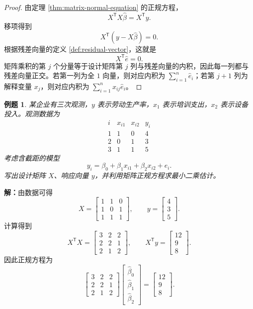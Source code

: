 \documentclass[UTF8,fontset=fandol,11pt]{ctexart}
\newtheorem{example}[definition]{例题}
\begin{document}
\begin{proof}
由定理 \eqref{thm:matrix-normal-equation} 的正规方程，
\[
X^{\mathsf T}X\hat\beta=X^{\mathsf T}y.
\]
移项得到
\[
X^{\mathsf T}(y-X\hat\beta)=0.
\]
根据残差向量的定义 \eqref{def:residual-vector}，这就是
\[
X^{\mathsf T}\hat e=0.
\]
矩阵乘积的第 $j$ 个分量等于设计矩阵第 $j$ 列与残差向量的内积，因此每一列都与残差向量正交。若第一列为全 $1$ 向量，则对应内积为 $\sum_{i=1}^{n}\hat e_i$；若第 $j+1$ 列为解释变量 $x_j$，则对应内积为 $\sum_{i=1}^{n}x_{ij}\hat e_i$。
\end{proof}
\begin{example}
某企业有三次观测，$y$ 表示劳动生产率，$x_1$ 表示培训支出，$x_2$ 表示设备投入。观测数据为
\[
\begin{array}{c|c|c|c}
 i&x_{i1}&x_{i2}&y_i\\ \hline
 1&1&0&4\\
 2&0&1&3\\
 3&1&1&5
\end{array}
\]
考虑含截距的模型
\[
y_i=\beta_0+\beta_1x_{i1}+\beta_2x_{i2}+e_i.
\]
写出设计矩阵 $X$、响应向量 $y$，并利用矩阵正规方程求最小二乘估计。
\end{example}
\par\noindent\textbf{解：}由数据可得
\[
X=\begin{bmatrix}1&1&0\\1&0&1\\1&1&1\end{bmatrix},
\qquad
 y=\begin{bmatrix}4\\3\\5\end{bmatrix}.
\]
计算得到
\[
X^{\mathsf T}X=
\begin{bmatrix}3&2&2\\2&2&1\\2&1&2\end{bmatrix},
\qquad
X^{\mathsf T}y=
\begin{bmatrix}12\\9\\8\end{bmatrix}.
\]
因此正规方程为
\[
\begin{bmatrix}3&2&2\\2&2&1\\2&1&2\end{bmatrix}
\begin{bmatrix}\hat\beta_0\\\hat\beta_1\\\hat\beta_2\end{bmatrix}
=
\begin{bmatrix}12\\9\\8\end{bmatrix}.
\]
\end{document}
